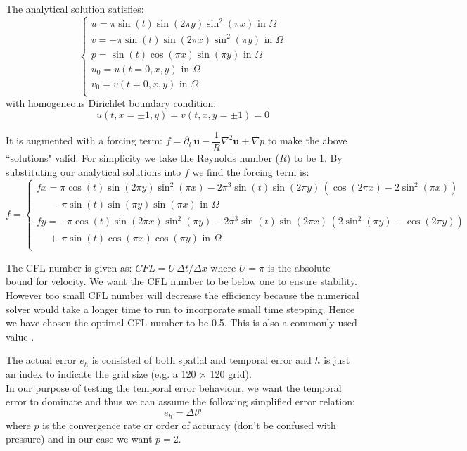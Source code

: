 The analytical solution satisfies:
\begin{equation}
\begin{cases}
u = \pi\sin(t)\sin(2\pi y)\sin^2(\pi x) \text{   in $\Omega$} \\
v = - \pi \sin(t)\sin(2\pi x)\sin^2(\pi y) \text{   in $\Omega$} \\
p = \sin(t)\cos(\pi x)\sin(\pi y)  \text{   in $\Omega$}  \\
u_0 = u(t=0,x,y)  \text{   in $\Omega$}  \\
v_0 = v(t=0,x,y)  \text{   in $\Omega$}  \\
\end{cases}
\end{equation}
with homogeneous Dirichlet boundary condition:
\begin{equation*}
u(t, x=\pm 1, y) = v(t, x,y= \pm 1) = 0
\end{equation*}

It is augmented with a forcing term: $f = \partial_t\,\textbf{u} - \dfrac{1}{R}\nabla^2 \textbf{u} + \nabla p$ to make the above ``solutions" valid. For simplicity we take the Reynolds number ($R$) to be 1. By substituting our analytical solutions into $f$ we find the forcing term is:
\begin{equation}
f = 
\begin{cases}
fx = \pi\cos(t)\sin(2\pi y)\sin^2(\pi x) -  2 \pi^3\sin(t)\sin(2\pi y)\,(\cos(2\pi x) - 2\sin^2(\pi x)) \\
\,\,\,\,\,\,\,- \, \pi\sin(t)\sin(\pi y)\sin(\pi x) \text{   in $\Omega$} \\
fy = - \pi\cos(t)\sin(2\pi x)\sin^2(\pi y) - 2\pi^3\sin(t)\sin(2\pi x)\,(2\sin^2(\pi y) - \cos(2\pi y)) \\
\,\,\,\,\,\,\,+ \, \pi\sin(t)\cos(\pi x)\cos(\pi y)  \text{   in $\Omega$}  \\
\end{cases}
\end{equation}

The CFL number is given as: $CFL = U\,\Delta t/\Delta x$ where $U = \pi$ is the absolute bound for velocity. We want the CFL number to be below one to ensure stability. However too small CFL number will decrease the efficiency because the numerical solver would take a longer time to run to incorporate small time stepping. Hence we have chosen the optimal CFL number to be 0.5. This is also a commonly used value \cite{brown2001accurate}.

The actual error $e_h$ is consisted of both spatial and temporal error and $h$ is just an index to indicate the grid size (e.g. a 120 $\times$ 120 grid).\\
In our purpose of testing the temporal error behaviour, we want the temporal error to dominate and thus we can assume the following simplified error relation:
\begin{equation}
e_h = \Delta t^p
\end{equation}
where $p$ is the convergence rate or order of accuracy (don't be confused with pressure) and in our case we want $p=2$.\\

